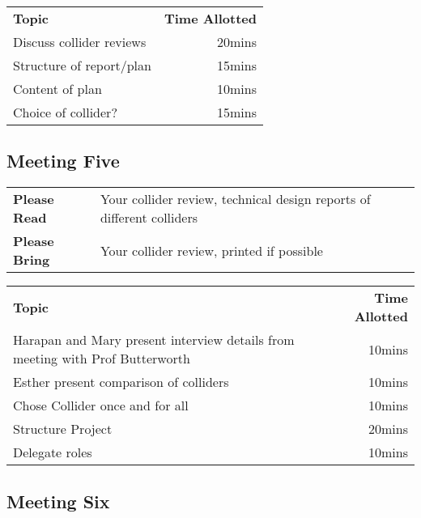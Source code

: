 \vspace{5mm}

\begin{tabularx}{\textwidth}{X r}
  \textbf{Topic} & \textbf{Time Allotted} \\
 
 Discuss collider reviews &
20mins \\
 
Structure of report/plan &
15mins \\
 
Content of plan &
10mins \\
 
Choice of collider? &
15mins \\
 
\end{tabularx}

\subsection{Meeting Five}

\begin{tabularx}{\textwidth}{l X}
  \textbf{Please Read} & Your collider review, technical design reports of different colliders \\
  \textbf{Please Bring} & Your collider review, printed if possible \\
\end{tabularx}

\vspace{5mm}

\begin{tabularx}{\textwidth}{X r}
  \textbf{Topic} & \textbf{Time Allotted} \\
 
 Harapan and Mary present interview details from meeting with Prof Butterworth &
10mins \\
 
Esther present comparison of colliders &
10mins \\
 
Chose Collider once and for all &
10mins \\
 
Structure Project &
20mins \\
 
Delegate roles &
10mins \\
 
\end{tabularx}

\subsection{Meeting Six}


